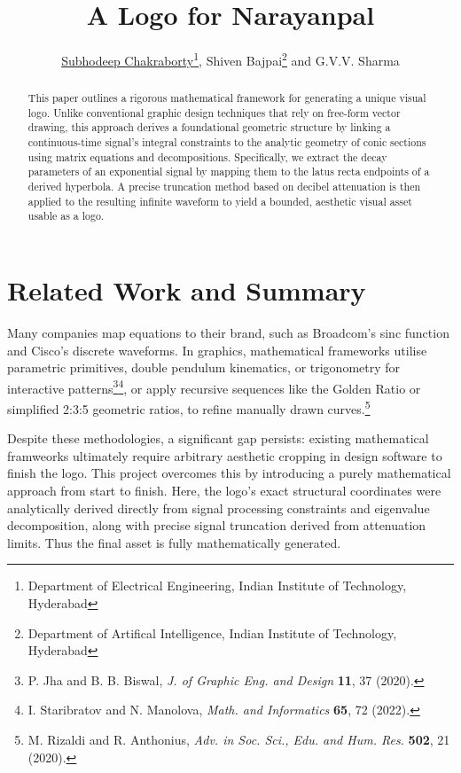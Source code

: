 \documentclass{article}
\date{}
\title{\bfseries\large{A Logo for Narayanpal}}
\author{\underline{Subhodeep Chakraborty}\footnote{Department of Electrical Engineering, Indian Institute of Technology, Hyderabad}, Shiven Bajpai\footnote{Department of Artifical Intelligence, Indian Institute of Technology, Hyderabad} and G.V.V. Sharma\footnotemark[1]}
\numberwithin{equation}{section}
\numberwithin{figure}{section}
\begin{document}
\maketitle

\begin{abstract}
This paper outlines a rigorous mathematical framework for generating a unique visual logo. Unlike conventional graphic design techniques that rely on free-form vector drawing, this approach derives a foundational geometric structure by linking a continuous-time signal's integral constraints to the analytic geometry of conic sections using matrix equations and decompositions. Specifically, we extract the decay parameters of an exponential signal by mapping them to the latus recta endpoints of a derived hyperbola. A precise truncation method based on decibel attenuation is then applied to the resulting infinite waveform to yield a bounded, aesthetic visual asset usable as a logo.
\end{abstract}

\section*{Related Work and Summary}
Many companies map equations to their brand, such as Broadcom's sinc function and Cisco's discrete waveforms.%
 In graphics, mathematical frameworks utilise parametric primitives, double pendulum kinematics, or trigonometry for interactive patterns\footnote{P. Jha and B. B. Biswal, \emph{J. of Graphic Eng. and Design} \textbf{11}, 37 (2020).}\footnote{I. Staribratov and N. Manolova, \emph{Math. and Informatics} \textbf{65}, 72 (2022).}, or apply recursive sequences like the Golden Ratio or simplified 2:3:5 geometric ratios, to refine manually drawn curves.\footnote{M. Rizaldi and R. Anthonius, \emph{Adv. in Soc. Sci., Edu. and Hum. Res.} \textbf{502}, 21 (2020).} 

Despite these methodologies, a significant gap persists: existing mathematical framweorks ultimately require arbitrary aesthetic cropping in design software to finish the logo. This project overcomes this by introducing a purely mathematical approach from start to finish. Here, the logo's exact structural coordinates were analytically derived directly from signal processing constraints and eigenvalue decomposition, along with precise signal truncation derived from attenuation limits. Thus the final asset is fully mathematically generated.
\end{document}
